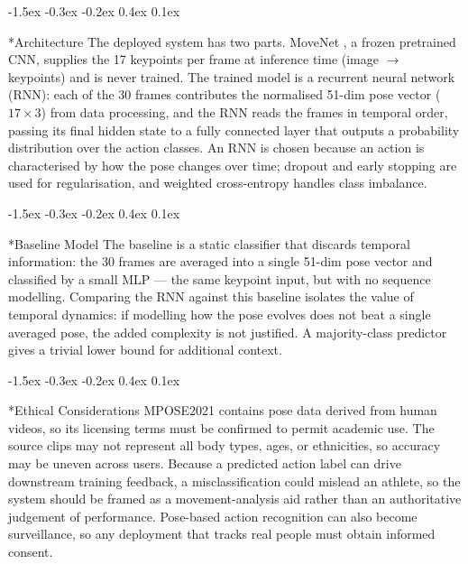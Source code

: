 \documentclass[final]{article}
\makeatletter
\renewcommand{\section}{%
  \@startsection{section}{1}{\z@}%
                {-1.5ex \@plus -0.3ex \@minus -0.2ex}%
                {0.4ex \@plus 0.1ex}%
                {\large\bf\raggedright}%
}
\makeatother
\begin{document}
\section*{Architecture}
The deployed system has two parts. MoveNet \citep{tensorflowmovenet}, a frozen pretrained CNN, supplies the 17 keypoints per frame at inference time (image $\to$ keypoints) and is never trained. The trained model is a recurrent neural network (RNN): each of the 30 frames contributes the normalised 51-dim pose vector ($17\times3$) from data processing, and the RNN reads the frames in temporal order, passing its final hidden state to a fully connected layer that outputs a probability distribution over the action classes. An RNN is chosen because an action is characterised by how the pose changes over time; dropout and early stopping are used for regularisation, and weighted cross-entropy handles class imbalance.

\section*{Baseline Model}
The baseline is a static classifier that discards temporal information: the 30 frames are averaged into a single 51-dim pose vector and classified by a small MLP --- the same keypoint input, but with no sequence modelling. Comparing the RNN against this baseline isolates the value of temporal dynamics: if modelling how the pose evolves does not beat a single averaged pose, the added complexity is not justified. A majority-class predictor gives a trivial lower bound for additional context.

\section*{Ethical Considerations}
MPOSE2021 contains pose data derived from human videos, so its licensing terms must be confirmed to permit academic use. The source clips may not represent all body types, ages, or ethnicities, so accuracy may be uneven across users. Because a predicted action label can drive downstream training feedback, a misclassification could mislead an athlete, so the system should be framed as a movement-analysis aid rather than an authoritative judgement of performance. Pose-based action recognition can also become surveillance, so any deployment that tracks real people must obtain informed consent.
\end{document}
